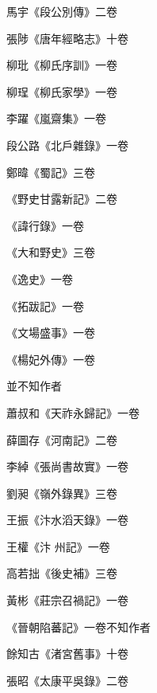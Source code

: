 \begin{pinyinscope}
 馬宇《段公別傳》二卷



 張陟《唐年經略志》十卷



 柳玭《柳氏序訓》一卷



 柳珵《柳氏家學》一卷



 李躍《嵐齋集》一卷



 段公路《北戶雜錄》一卷



 鄭暐《蜀記》三卷



 《野史甘露新記》二卷



 《諱行錄》一卷



 《大和野史》三卷



 《逸史》一卷



 《拓跋記》一卷



 《文場盛事》一卷



 《楊妃外傳》一卷



 並不知作者



 蕭叔和《天祚永歸記》一卷



 薛圖存《河南記》二卷



 李綽《張尚書故實》一卷



 劉昶《嶺外錄異》三卷



 王振《汴水滔天錄》一卷



 王權《汴
 州記》一卷



 高若拙《後史補》三卷



 黃彬《莊宗召禍記》一卷



 《晉朝陷蕃記》一卷不知作者



 餘知古《渚宮舊事》十卷



 張昭《太康平吳錄》二卷




\end{pinyinscope}
